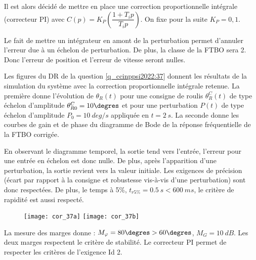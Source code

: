 \ifprof
\else
Il est alors décidé de mettre en place une correction proportionnelle intégrale (correcteur PI)
avec $C(p) = K_P\left(\dfrac{1+T_i p}{T_i p}\right)$. On fixe pour la suite $K_P = 0,1$.
\fi

\ifprof
\begin{corrige}
Le fait de mettre un intégrateur en amont de la perturbation permet d’annuler l’erreur due à un échelon de perturbation.
De plus, la classe de la FTBO sera 2. Donc l’erreur de position et l’erreur de vitesse seront nulles.

\end{corrige}
\else
\fi

\ifprof
\else
Les figures du DR de la question \ref{q_ccinppsi2022:37} donnent les résultats de la simulation du système avec la
correction proportionnelle intégrale retenue. La première donne l’évolution de $\theta_R(t)$ pour une
consigne de roulis $\theta_R^C(t)$ de type échelon d’amplitude $\theta_{R0}^C = 10\degres$ et pour une perturbation $P(t)$ de
type échelon d’amplitude $P_0 =\SI{10}{deg/s}$ appliquée en $t = \SI{2}{s}$. La seconde donne les courbes
de gain et de phase du diagramme de Bode de la réponse fréquentielle de la FTBO corrigée.
\fi

\ifprof
\begin{corrige}
En observant le diagramme temporel, la sortie tend vers l’entrée, l’erreur pour une entrée en échelon est donc nulle. De plus, après l’apparition d’une perturbation, la sortie revient vers la valeur initiale.
Les exigences de précision (écart par rapport à la consigne et robustesse vis-à-vis d’une perturbation) sont donc respectées.
De plus, le temps à 5\%, $t_{r5\%}=\SI{0,5}{s}<\SI{600}{ms}$, le critère de rapidité est aussi respecté.


\begin{figure}[H]
\centering
\texttt{[image: cor\_37a]}
\hfill
\texttt{[image: cor\_37b]}
\end{figure}

La mesure des marges donne : 
$M_{\varphi}=80\degres >60 \degres$, $M_G=\SI{10}{dB}$.
Les deux marges respectent le critère de stabilité.
Le correcteur PI permet de respecter les critères de l’exigence Id 2.


\end{corrige}
\else
\fi

